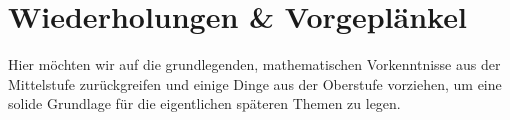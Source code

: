 \chapter{Wiederholungen \& Vorgeplänkel}
Hier möchten wir auf die grundlegenden, mathematischen Vorkenntnisse aus der Mittelstufe zurückgreifen und einige Dinge aus der Oberstufe vorziehen, um eine solide Grundlage für die eigentlichen späteren Themen zu legen.



















